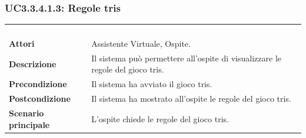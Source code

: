 \subsubsection{UC3.3.4.1.3: Regole tris}
\label{UC3.3.4.1.3}
\begin{longtable}{l|p{10cm}}
	\rowcolor[gray]{0.8} \multicolumn{2}{c}{} \\
	\rowcolor[gray]{0.8} \multicolumn{2}{c}{\textbf{UC3.3.4.1.3 - Regole tris}} \\
	\rowcolor[gray]{0.8} \multicolumn{2}{c}{} \\
	\hline
	&\\
	\textbf{Attori} & Assistente Virtuale, Ospite.\\[7pt]
	\textbf{Descrizione} & Il sistema può permettere all'ospite di visualizzare le regole del gioco tris.\\[7pt]
	\textbf{Precondizione} & Il sistema ha avviato il gioco tris.\\[7pt]
	\textbf{Postcondizione} & Il sistema ha mostrato all'ospite le regole del gioco tris.\\[7pt]
	\textbf{Scenario principale} &L'ospite chiede le regole del gioco tris.\\[7pt]\hline
\end{longtable}

